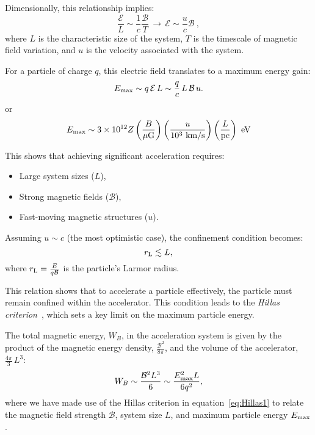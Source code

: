 Dimensionally, this relationship implies:
\begin{equation}
\frac{\mathcal E}{L} \sim \frac{1}{c} \frac{\mathcal B}{T} \, \longrightarrow \, \mathcal E \sim \frac{u}{c} \mathcal B~,
\end{equation}
where \( L \) is the characteristic size of the system, \( T \) is the timescale of magnetic field variation, and \( u \) is the velocity associated with the system.

For a particle of charge \( q \), this electric field translates to a maximum energy gain:
\begin{equation}\label{eq:Hillas1}
E_{\rm max} \sim q \, \mathcal E \, L \sim \frac{q}{c} \, L \, \mathcal B \, u.
\end{equation}
or 
\[
E_{\rm max} \sim 3 \times 10^{12} Z \left( \frac{B}{\mu\text{G}} \right) \left( \frac{u}{10^3~\text{km/s}} \right) \left( \frac{L}{\text{pc}} \right)~\text{eV}
\]

This shows that achieving significant acceleration requires:
%
\begin{itemize}
\item Large system sizes (\( L \)),
\item Strong magnetic fields (\( \mathcal B \)),
\item Fast-moving magnetic structures (\( u \)).
\end{itemize}

Assuming \( u \sim c \) (the most optimistic case), the confinement condition becomes:
\begin{equation}
r_{\rm L} \lesssim L,
\end{equation}
where \( r_{\rm L} = \frac{E}{q \mathcal B} \) is the particle's Larmor radius. 

This relation shows that to accelerate a particle effectively, the particle must remain confined within the accelerator. 
%
This condition leads to the \emph{Hillas criterion}~\cite{Hillas1984}, which sets a key limit on the maximum particle energy. 

The total magnetic energy, \( W_B \), in the acceleration system is given by the product of the magnetic energy density, \( \frac{\mathcal{B}^2}{8\pi} \), and the volume of the accelerator, \( \frac{4\pi}{3} \, L^3 \):  
\begin{equation}
W_B \sim \frac{\mathcal{B}^2 L^3}{6} \sim \frac{E_{\rm max}^2 L}{6 q^2},
\end{equation}
where we have made use of the Hillas criterion in equation~\ref{eq:Hillas1} to relate the magnetic field strength \( \mathcal{B} \), system size \( L \), and maximum particle energy \( E_{\rm max} \).  

